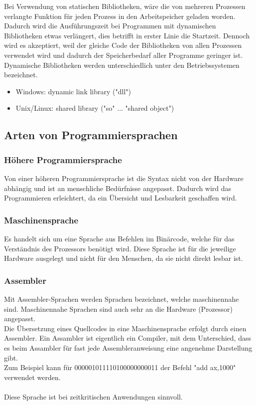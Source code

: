 \documentclass[12pt,a4paper]{report}
\begin{document}
\begin{onehalfspace}
\begin{itemize}
Bei Verwendung von statischen Bibliotheken, wäre die von mehreren Prozessen verlangte Funktion für jeden Prozess in den Arbeitspeicher geladen worden.\\

Dadurch wird die Ausführungszeit bei Programmen mit dynamischen Bibliotheken etwas verlängert, dies betrifft in erster Linie die Startzeit. Dennoch wird es akzeptiert, weil der gleiche Code der Bibliotheken von allen Prozessen verwendet wird und dadurch der Speicherbedarf aller Programme geringer ist.
\\Dynamische Bibliotheken werden unterschiedlich unter den Betriebssystemen bezeichnet.
\begin{itemize}
\item Windows: dynamic link library ("{}dll"{})
\item Unix/Linux: shared library ("{}so"{} ... "{}shared object"{})
\end{itemize}

\end{itemize}

\subsection{Arten von Programmiersprachen}
\subsubsection{Höhere Programmiersprache} 
Von einer höheren Programmiersprache ist die Syntax nicht von der Hardware abhängig und ist an menschliche Bedürfnisse angepasst. Dadurch wird das Programmieren erleichtert, da ein Übersicht und Lesbarkeit geschaffen wird.

\subsubsection{Maschinensprache}
Es handelt sich um eine Sprache aus Befehlen im Binärcode, welche für das Verständnis des Prozessors benötigt wird. Diese Sprache ist für die jeweilige Hardware ausgelegt und nicht für den Menschen, da sie nicht direkt lesbar ist.

\subsubsection{Assembler}
Mit Assembler-Sprachen werden Sprachen bezeichnet, welche maschinennahe sind. Maschinennahe Sprachen sind auch sehr an die Hardware (Prozessor) angepasst.\\
Die Übersetzung eines Quellcodes in eine Maschinensprache erfolgt durch einen Assembler. Ein Assambler ist eigentlich ein Compiler, mit dem Unterschied, dass es beim Assambler für fast jede Assembleranweisung eine angenehme Darstellung gibt.
\\Zum Beispiel kann für 000001011110100000000011 der Befehl "{}add ax,1000"{} verwendet werden.\\
\\Diese Sprache ist bei zeitkritischen Anwendungen sinnvoll.


\end{onehalfspace}
\end{document}
